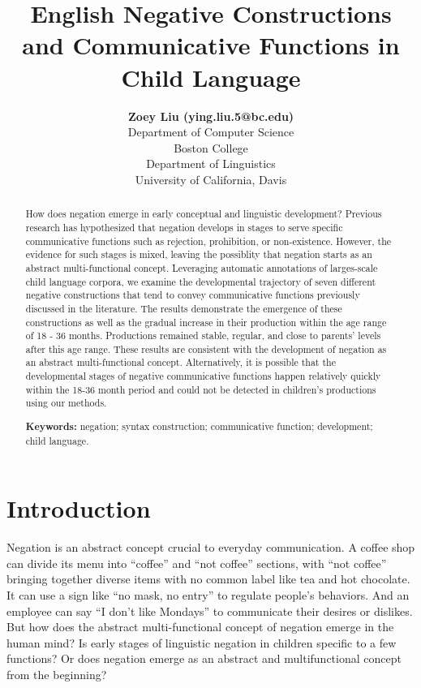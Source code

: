 \documentclass[10pt, letterpaper]{article}
\title{English Negative Constructions and Communicative Functions in Child
Language}
\author{{\large \bf Zoey Liu (ying.liu.5@bc.edu)} \\ Department of Computer Science \\ Boston College \AND {\large \bf Masoud Jasbi (jasbi@ucdavis.edu)} \\ Department of Linguistics \\ University of California, Davis}
\begin{document}
\maketitle

\begin{abstract}
How does negation emerge in early conceptual and linguistic development?
Previous research has hypothesized that negation develops in stages to
serve specific communicative functions such as rejection, prohibition,
or non-existence. However, the evidence for such stages is mixed,
leaving the possiblity that negation starts as an abstract
multi-functional concept. Leveraging automatic annotations of
larges-scale child language corpora, we examine the developmental
trajectory of seven different negative constructions that tend to convey
communicative functions previously discussed in the literature. The
results demonstrate the emergence of these constructions as well as the
gradual increase in their production within the age range of 18 - 36
months. Productions remained stable, regular, and close to parents'
levels after this age range. These results are consistent with the
development of negation as an abstract multi-functional concept.
Alternatively, it is possible that the developmental stages of negative
communicative functions happen relatively quickly within the 18-36 month
period and could not be detected in children's productions using our
methods.

\textbf{Keywords:}
negation; syntax construction; communicative function; development;
child language.
\end{abstract}

\hypertarget{introduction}{%
\section{Introduction}\label{introduction}}

Negation is an abstract concept crucial to everyday communication. A
coffee shop can divide its menu into ``coffee'' and ``not coffee''
sections, with ``not coffee'' bringing together diverse items with no
common label like tea and hot chocolate. It can use a sign like ``no
mask, no entry'' to regulate people's behaviors. And an employee can say
``I don't like Mondays'' to communicate their desires or dislikes. But
how does the abstract multi-functional concept of negation emerge in the
human mind? Is early stages of linguistic negation in children specific
to a few functions? Or does negation emerge as an abstract and
multifunctional concept from the beginning?
\end{document}
